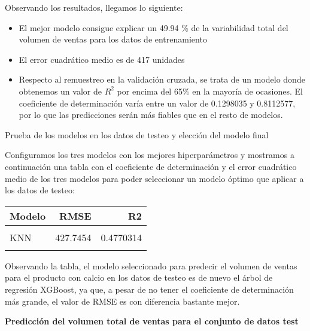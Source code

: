 \documentclass[
]{article}
\providecommand{\tightlist}{%
  \setlength{\itemsep}{0pt}\setlength{\parskip}{0pt}}
\begin{document}
Observando los resultados, llegamos lo siguiente:

\begin{itemize}
\tightlist
\item
  El mejor modelo consigue explicar un 49.94 \% de la variabilidad total
  del volumen de ventas para los datos de entrenamiento
\item
  El error cuadrático medio es de 417 unidades
\item
  Respecto al remuestreo en la validación cruzada, se trata de un modelo
  donde obtenemos un valor de \(R^2\) por encima del 65\% en la mayoría
  de ocasiones. El coeficiente de determinación varía entre un valor de
  0.1298035 y 0.8112577, por lo que las predicciones serán más fiables
  que en el resto de modelos.
\end{itemize}

Prueba de los modelos en los datos de testeo y elección del modelo final

Configuramos los tres modelos con los mejores hiperparámetros y
mostramos a continuación una tabla con el coeficiente de determinación y
el error cuadrático medio de los tres modelos para poder seleccionar un
modelo óptimo que aplicar a los datos de testeo:

\begin{table}[H]
\centering
\begin{tabular}{lrr}
\toprule
Modelo & RMSE & R2\\
\midrule
\cellcolor{gray!6}{SVM} & \cellcolor{gray!6}{410.0530} & \cellcolor{gray!6}{0.5084297}\\
KNN & 427.7454 & 0.4770314\\
\cellcolor{gray!6}{XGBoost} & \cellcolor{gray!6}{256.4490} & \cellcolor{gray!6}{0.4874286}\\
\bottomrule
\end{tabular}
\end{table}

Observando la tabla, el modelo seleccionado para predecir el volumen de
ventas para el producto con calcio en los datos de testeo es de nuevo el
árbol de regresión XGBoost, ya que, a pesar de no tener el coeficiente
de determinación más grande, el valor de RMSE es con diferencia bastante
mejor.

\textbf{Predicción del volumen total de ventas para el conjunto de datos
test}
\end{document}
